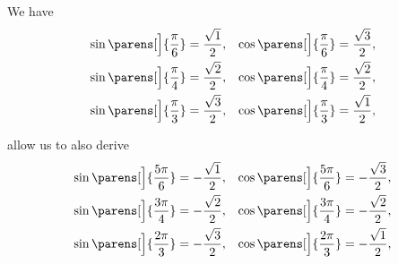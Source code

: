 \begin{proposition}\label{thm:trigonometric_function_secondary_roots}
  We have
  \begin{align}
    \sin\parens[\Big]{\frac \pi 6} = \frac {\sqrt 1} 2, && \cos\parens[\Big]{\frac \pi 6} = \frac {\sqrt 3} 2, \label{eq:thm:trigonometric_function_secondary_roots/sixth} \\
    \sin\parens[\Big]{\frac \pi 4} = \frac {\sqrt 2} 2, && \cos\parens[\Big]{\frac \pi 4} = \frac {\sqrt 2} 2, \label{eq:thm:trigonometric_function_secondary_roots/quarter} \\
    \sin\parens[\Big]{\frac \pi 3} = \frac {\sqrt 3} 2, && \cos\parens[\Big]{\frac \pi 3} = \frac {\sqrt 1} 2, \label{eq:thm:trigonometric_function_secondary_roots/third}
  \end{align}

   allow us to also derive
  \begin{align}
    \sin\parens[\Big]{\frac {5\pi} 6} = -\frac {\sqrt 1} 2, && \cos\parens[\Big]{\frac {5\pi} 6} = -\frac {\sqrt 3} 2, \label{eq:thm:trigonometric_function_secondary_roots/five_sixths} \\
    \sin\parens[\Big]{\frac {3\pi} 4} = -\frac {\sqrt 2} 2, && \cos\parens[\Big]{\frac {3\pi} 4} = -\frac {\sqrt 2} 2, \label{eq:thm:trigonometric_function_secondary_roots/three_quarters} \\
    \sin\parens[\Big]{\frac {2\pi} 3} = -\frac {\sqrt 3} 2, && \cos\parens[\Big]{\frac {2\pi} 3} = -\frac {\sqrt 1} 2, \label{eq:thm:trigonometric_function_secondary_roots/two_thirds}
  \end{align}
\end{proposition}
